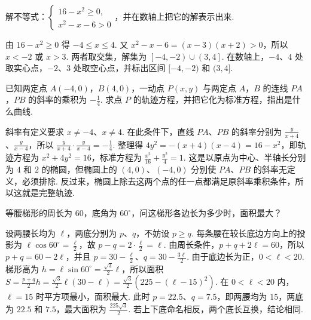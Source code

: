 \begin{problem}
解不等式：\(\begin{cases}
16-x^2\ge0,\\
x^2-x-6>0
\end{cases}\)，并在数轴上把它的解表示出来.
\end{problem}

\begin{solution}
由 \(16-x^2\ge0\) 得 \(-4\le x\le4\). 又 \(x^2-x-6=(x-3)(x+2)>0\)，所以 \(x<-2\) 或 \(x>3\). 两者取交集，解集为 \(\left[-4,-2\right)\cup\left(3,4\right]\). 在数轴上，\(-4\)、\(4\) 处取实心点，\(-2\)、\(3\) 处取空心点，并标出区间 \([-4,-2)\) 和 \((3,4]\).
\end{solution}

\begin{problem}
已知两定点 \(A(-4,0)\)，\(B(4,0)\)，一动点 \(P(x,y)\) 与两定点 \(A\)，\(B\) 的连线 \(PA\)，\(PB\) 的斜率的乘积为 \(-\frac{1}{4}\). 求点 \(P\) 的轨迹方程，并把它化为标准方程，指出是什么曲线.
\end{problem}

\begin{solution}
斜率有定义要求 \(x\ne-4\)、\(x\ne4\). 在此条件下，直线 \(PA\)、\(PB\) 的斜率分别为 \(\frac{y}{x+4}\)、\(\frac{y}{x-4}\)，所以 \(\frac{y}{x+4}\cdot\frac{y}{x-4}=-\frac14\). 整理得 \(4y^2=-(x+4)(x-4)=16-x^2\)，即轨迹方程为 \(x^2+4y^2=16\)，标准方程为 \(\frac{x^2}{16}+\frac{y^2}{4}=1\). 这是以原点为中心、半轴长分别为 \(4\) 和 \(2\) 的椭圆，但椭圆上的 \((4,0)\)、\((-4,0)\) 分别使 \(PA\)、\(PB\) 的斜率无定义，必须排除. 反过来，椭圆上除去这两个点的任一点都满足原斜率乘积条件，所以这就是完整轨迹.
\end{solution}

\begin{problem}
等腰梯形的周长为 \(60\)，底角为 \(60^\circ\)，问这梯形各边长为多少时，面积最大？

\end{problem}

\begin{solution}
设两腰长均为 \(\ell\)，两底分别为 \(p\)、\(q\)，不妨设 \(p\ge q\). 每条腰在较长底边方向上的投影为 \(\ell\cos60^\circ=\frac{\ell}{2}\)，故 \(p-q=2\cdot\frac{\ell}{2}=\ell\). 由周长条件，\(p+q+2\ell=60\)，所以 \(p+q=60-2\ell\)，并且 \(p=30-\frac{\ell}{2}\)、\(q=30-\frac{3\ell}{2}\). 由于底边长为正，\(0<\ell<20\). 梯形高为 \(h=\ell\sin60^\circ=\frac{\sqrt3}{2}\ell\)，所以面积 \(S=\frac{p+q}{2}h=\frac{\sqrt3}{2}\ell(30-\ell)=\frac{\sqrt3}{2}\left(225-(\ell-15)^2\right)\). 在 \(0<\ell<20\) 内，\(\ell=15\) 时平方项最小，面积最大. 此时 \(p=22.5\)、\(q=7.5\)，即两腰均为 \(15\)，两底为 \(22.5\) 和 \(7.5\)，最大面积为 \(\frac{225\sqrt3}{2}\). 若上下底命名相反，两个底长互换，结论相同.
\end{solution}

